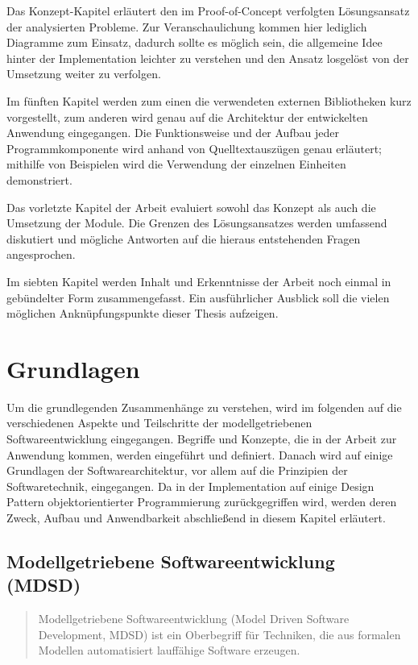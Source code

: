 \documentclass[12pt,oneside,a4paper,parskip]{scrbook}
\begin{document}
Das Konzept-Kapitel erläutert den im Proof-of-Concept verfolgten Lösungsansatz der analysierten Probleme. Zur Veranschaulichung kommen hier lediglich Diagramme zum Einsatz, dadurch sollte es möglich sein, die allgemeine Idee hinter der Implementation leichter zu verstehen und den Ansatz losgelöst von der Umsetzung weiter zu verfolgen.

Im fünften Kapitel werden zum einen die verwendeten externen Bibliotheken kurz vorgestellt, zum anderen wird genau auf die Architektur der entwickelten Anwendung eingegangen. Die Funktionsweise und der Aufbau jeder Programmkomponente wird anhand von Quelltextauszügen genau erläutert; mithilfe von Beispielen wird die Verwendung der einzelnen Einheiten demonstriert.

Das vorletzte Kapitel der Arbeit evaluiert sowohl das Konzept als auch die Umsetzung der Module. Die Grenzen des Lösungsansatzes werden umfassend diskutiert und mögliche Antworten auf die hieraus entstehenden Fragen angesprochen.

Im siebten Kapitel werden Inhalt und Erkenntnisse der Arbeit noch einmal in gebündelter Form zusammengefasst. Ein ausführlicher Ausblick soll die vielen möglichen Anknüpfungspunkte dieser Thesis aufzeigen.

\chapter{Grundlagen}

Um die grundlegenden Zusammenhänge zu verstehen, wird im folgenden auf die verschiedenen Aspekte und Teilschritte der modellgetriebenen Softwareentwicklung eingegangen. Begriffe und Konzepte, die in der Arbeit zur Anwendung kommen, werden eingeführt und definiert. Danach wird auf einige Grundlagen der Softwarearchitektur, vor allem auf die Prinzipien der Softwaretechnik, eingegangen. Da in der Implementation auf einige Design Pattern objektorientierter Programmierung zurückgegriffen wird, werden deren Zweck, Aufbau und Anwendbarkeit abschließend in diesem Kapitel erläutert.

\section{Modellgetriebene Softwareentwicklung (MDSD)}

\begin{quote}\glqq Modellgetriebene Softwareentwicklung (Model Driven Software Development, MDSD) ist ein Oberbegriff für Techniken, die aus formalen Modellen automatisiert lauffähige Software erzeugen.\grqq \end{quote}
\end{document}
